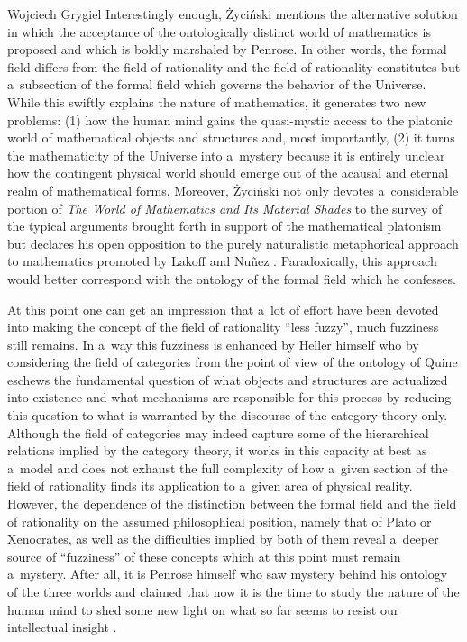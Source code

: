 \begin{artengenv}{Wojciech Grygiel}
Interestingly enough, Życiński mentions the alternative solution in which the acceptance of the ontologically distinct world of mathematics is proposed and which is boldly marshaled by Penrose. In other words, the formal field differs from the field of rationality and the field of rationality constitutes but a~subsection of the formal field which governs the behavior of the Universe. While this swiftly explains the nature of mathematics, it generates two new problems: (1) how the human mind gains the quasi-mystic access to the platonic world of mathematical objects and structures and, most importantly, (2) it turns the mathematicity of the Universe into a~mystery because it is entirely unclear how the contingent physical world should emerge out of the acausal and eternal realm of mathematical forms. Moreover, Życiński not only devotes a~considerable portion of \textit{The World of Mathematics and Its Material Shades} to the survey of the typical arguments brought forth in support of the mathematical platonism but declares his open opposition to the purely naturalistic metaphorical approach to mathematics promoted by Lakoff and Nuñez
\parencites[][]{lakoff_where_2000}[][pp.48–49]{zycinski_swiat_2013}. %
 Paradoxically, this approach would better correspond with the ontology of the formal field which he confesses.

At this point one can get an impression that a~lot of effort have been devoted into making the concept of the field of rationality ``less fuzzy'', much fuzziness still remains. In a~way this fuzziness is enhanced by Heller himself who by considering the field of categories from the point of view of the ontology of Quine eschews the fundamental question of what objects and structures are actualized into existence and what mechanisms are responsible for this process by reducing this question to what is warranted by the discourse of the category theory only. Although the field of categories may indeed capture some of the hierarchical relations implied by the category theory, it works in this capacity at best as a~model and does not exhaust the full complexity of how a~given section of the field of rationality finds its application to a~given area of physical reality. However, the dependence of the distinction between the formal field and the field of rationality on the assumed philosophical position, namely that of Plato or Xenocrates, as well as the difficulties implied by both of them reveal a~deeper source of ``fuzziness'' of these concepts which at this point must remain a~mystery. After all, it is Penrose himself who saw mystery behind his ontology of the three worlds and claimed that now it is the time to study the nature of the human mind to shed some new light on what so far seems to resist our intellectual insight
\parencite[][]{brozek_umysl_2014}.%


\end{artengenv}
